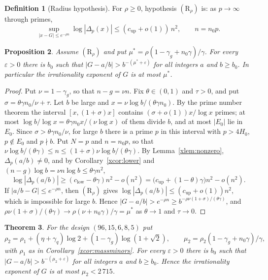 \documentclass[11pt]{article}
\newtheorem{theorem}{Theorem}
\newtheorem{proposition}[theorem]{Proposition}
\theoremstyle{definition}
\newtheorem{definition}[theorem]{Definition}
\begin{document}
\begin{definition}[Radius hypothesis]\label{xdef:radius}
For $\rho\ge0$, hypothesis $(\mathrm R_\rho)$ is: as $p\to\infty$ through primes,
\[
\sup_{|x-G|\le e^{-\rho n}}\log|\Delta_p(x)|\le(c_{\mathrm{up}}+o(1))\,n^2,\qquad n=n_0p .
\]
\end{definition}

\begin{proposition}\label{xprop:power}
Assume $(\mathrm R_\rho)$ and put $\mu^*=\rho(1-\gamma_g+n_0\gamma)/\gamma$. For every $\varepsilon>0$ there is $b_0$ such that $|G-a/b|>b^{-(\mu^*+\varepsilon)}$ for all integers $a$ and $b\ge b_0$. In particular the irrationality exponent of $G$ is at most $\mu^*$.
\end{proposition}

\begin{proof}
Put $\nu=1-\gamma_g$, so that $n-g=\nu n$. Fix $\theta\in(0,1)$ and $\tau>0$, and put $\sigma=\theta\gamma n_0/\nu+\tau$. Let $b$ be large and $x=\nu\log b/(\theta\gamma n_0)$. By the prime number theorem the interval $[x,(1+\sigma)x]$ contains $(\sigma+o(1))x/\log x$ primes; at most $\log b/\log x=\theta\gamma n_0x/(\nu\log x)$ of them divide $b$, and at most $|E_0|$ lie in $E_0$. Since $\sigma>\theta\gamma n_0/\nu$, for large $b$ there is a prime $p$ in this interval with $p>4H_0$, $p\notin E_0$ and $p\nmid b$. Put $N=p$ and $n=n_0p$, so that $\nu\log b/(\theta\gamma)\le n\le(1+\sigma)\nu\log b/(\theta\gamma)$. By Lemma~\ref{xlem:nonzero}, $\Delta_p(a/b)\ne0$, and by Corollary~\ref{xcor:lower} and $(n-g)\log b=\nu n\log b\le\theta\gamma n^2$,
\[
\log|\Delta_p(a/b)|\ge(c_{\mathrm{low}}-\theta\gamma)n^2-o(n^2)=\big(c_{\mathrm{up}}+(1-\theta)\gamma\big)n^2-o(n^2).
\]
If $|a/b-G|\le e^{-\rho n}$, then $(\mathrm R_\rho)$ gives $\log|\Delta_p(a/b)|\le(c_{\mathrm{up}}+o(1))n^2$, which is impossible for large $b$. Hence $|G-a/b|>e^{-\rho n}\ge b^{-\rho\nu(1+\sigma)/(\theta\gamma)}$, and $\rho\nu(1+\sigma)/(\theta\gamma)\to\rho(\nu+n_0\gamma)/\gamma=\mu^*$ as $\theta\to1$ and $\tau\to0$.
\end{proof}

\begin{theorem}\label{xthm:exponent}
For the design $(96,15,6,8,5)$ put
\[
\rho_2=\rho_1+(\eta+\gamma_q)\log2+(1-\gamma_g)\log(1+\sqrt2),\qquad \mu_2=\rho_2(1-\gamma_g+n_0\gamma)/\gamma ,
\]
with $\rho_1$ as in Corollary~\ref{xcor:massminors}. For every $\varepsilon>0$ there is $b_0$ such that $|G-a/b|>b^{-(\mu_2+\varepsilon)}$ for all integers $a$ and $b\ge b_0$. Hence the irrationality exponent of $G$ is at most $\mu_2<2\,715$.
\end{theorem}
\end{document}

